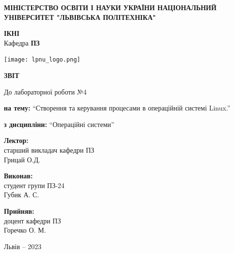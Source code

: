 \documentclass[12pt]{extarticle}
\begin{document}
\begin{titlepage}
    \begin{center}
        \textbf{\normalsize{\MakeUppercase{
            Міністерство Освіти і науки України
            Національний університет "Львівська політехніка"
        }}}

        \begin{flushright}
        \textbf{ІКНІ}\\
        Кафедра \textbf{ПЗ}
        \end{flushright}
        \vspace{15mm}

        \texttt{[image: lpnu\_logo.png]}

        \vspace*{\fill}

        \textbf{\normalsize{\MakeUppercase{Звіт}}}
            
        До лабораторної роботи №4

        \textbf{на тему:} “Створення та керування процесами в операційній системі Linux.”

        \textbf{з дисципліни:} “Операційні системи”
            
        \vspace*{\fill}

        \begin{flushright}

            \textbf{Лектор:}\\
            старший викладач кафедри ПЗ\\
            Грицай О.Д.\\
            \vspace{12pt}

            \textbf{Виконав:}\\
            студент групи ПЗ-24\\
            Губик А. С.\\
            \vspace{12pt}

            \textbf{Прийняв:}\\
            доцент кафедри ПЗ\\
            Горечко О. М.\\
        \vspace{12pt}
        \end{flushright}

        Львів -- 2023
            
            
    \end{center}
\end{titlepage}
\end{document}
